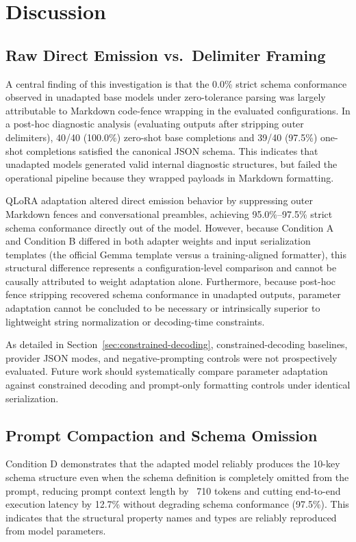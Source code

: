 \documentclass[11pt,a4paper]{article}
\begin{document}
\section{Discussion}

\subsection{Raw Direct Emission vs.\ Delimiter Framing}
A central finding of this investigation is that the 0.0\% strict schema conformance observed in unadapted base models under zero-tolerance parsing was largely attributable to Markdown code-fence wrapping in the evaluated configurations. In a post-hoc diagnostic analysis (evaluating outputs after stripping outer delimiters), 40/40 (100.0\%) zero-shot base completions and 39/40 (97.5\%) one-shot completions satisfied the canonical JSON schema. This indicates that unadapted models generated valid internal diagnostic structures, but failed the operational pipeline because they wrapped payloads in Markdown formatting.

QLoRA adaptation altered direct emission behavior by suppressing outer Markdown fences and conversational preambles, achieving 95.0\%--97.5\% strict schema conformance directly out of the model. However, because Condition A and Condition B differed in both adapter weights and input serialization templates (the official Gemma template versus a training-aligned formatter), this structural difference represents a configuration-level comparison and cannot be causally attributed to weight adaptation alone. Furthermore, because post-hoc fence stripping recovered schema conformance in unadapted outputs, parameter adaptation cannot be concluded to be necessary or intrinsically superior to lightweight string normalization or decoding-time constraints.

As detailed in Section~\ref{sec:constrained-decoding}, constrained-decoding baselines, provider JSON modes, and negative-prompting controls were not prospectively evaluated. Future work should systematically compare parameter adaptation against constrained decoding and prompt-only formatting controls under identical serialization.

\subsection{Prompt Compaction and Schema Omission}
Condition D demonstrates that the adapted model reliably produces the 10-key schema structure even when the schema definition is completely omitted from the prompt, reducing prompt context length by ~710 tokens and cutting end-to-end execution latency by 12.7\% without degrading schema conformance (97.5\%). This indicates that the structural property names and types are reliably reproduced from model parameters.
\end{document}
